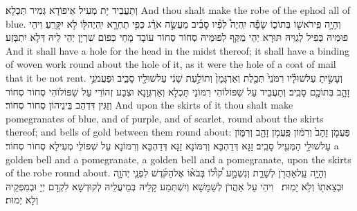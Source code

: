 {וְתַעֲבֵיד יָת מְעִיל אֵיפוֹדָא גְּמִיר תַּכְלָא׃}
{And thou shalt make the robe of the ephod all of blue.}{}
{וְהָיָ֥ה פִֽי\maqqaf רֹאשׁ֖וֹ בְּתוֹכ֑וֹ שָׂפָ֡ה יִֽהְיֶה֩ לְפִ֨יו סָבִ֜יב מַעֲשֵׂ֣ה אֹרֵ֗ג כְּפִ֥י תַחְרָ֛א יִֽהְיֶה\maqqaf לּ֖וֹ לֹ֥א יִקָּרֵֽעַ׃}
{וִיהֵי פוּמֵּיהּ כְּפִיל לְגַוֵּיהּ תּוּרָא יְהֵי מַקַּף לְפוּמֵּיהּ סְחוֹר סְחוֹר עוֹבָד מָחֵי כְּפוֹם שִׁרְיָן יְהֵי לֵיהּ דְּלָא יִתְבְּזַע׃}
{And it shall have a hole for the head in the midst thereof; it shall have a binding of woven work round about the hole of it, as it were the hole of a coat of mail that it be not rent.}{}
{וְעָשִׂ֣יתָ עַל\maqqaf שׁוּלָ֗יו רִמֹּנֵי֙ תְּכֵ֤לֶת וְאַרְגָּמָן֙ וְתוֹלַ֣עַת שָׁנִ֔י עַל\maqqaf שׁוּלָ֖יו סָבִ֑יב וּפַעֲמֹנֵ֥י זָהָ֛ב בְּתוֹכָ֖ם סָבִֽיב׃}
{וְתַעֲבֵיד עַל שִׁפּוֹלוֹהִי רִמּוֹנֵי תַּכְלָא וְאַרְגְּוָנָא וּצְבַע זְהוֹרִי עַל שִׁפּוֹלוֹהִי סְחוֹר סְחוֹר וְזַגִּין דִּדְהַב בֵּינֵיהוֹן סְחוֹר סְחוֹר׃}
{And upon the skirts of it thou shalt make pomegranates of blue, and of purple, and of scarlet, round about the skirts thereof; and bells of gold between them round about:}{}
{פַּעֲמֹ֤ן זָהָב֙ וְרִמּ֔וֹן פַּֽעֲמֹ֥ן זָהָ֖ב וְרִמּ֑וֹן עַל\maqqaf שׁוּלֵ֥י הַמְּעִ֖יל סָבִֽיב׃}
{זַגָּא דְּדַהְבָּא וְרִמּוֹנָא זַגָּא דְּדַהְבָּא וְרִמּוֹנָא עַל שִׁפּוֹלֵי מְעִילָא סְחוֹר סְחוֹר׃}
{a golden bell and a pomegranate, a golden bell and a pomegranate, upon the skirts of the robe round about.}{}
{וְהָיָ֥ה עַֽל\maqqaf אַהֲרֹ֖ן לְשָׁרֵ֑ת וְנִשְׁמַ֣ע ק֠וֹל֠וֹ בְּבֹא֨וֹ אֶל\maqqaf הַקֹּ֜דֶשׁ לִפְנֵ֧י יְהֹוָ֛ה וּבְצֵאת֖וֹ וְלֹ֥א יָמֽוּת׃ \setuma }
{וִיהֵי עַל אַהֲרֹן לְשַׁמָּשָׁא וְיִשְׁתְּמַע קָלֵיהּ בְּמֵיעֲלֵיהּ לְקוּדְשָׁא לִקְדָם יְיָ וּבְמִפְּקֵיהּ וְלָא יְמוּת׃}
